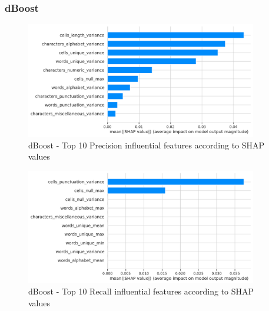 \subsubsection{dBoost}
\begin{figure}[H]
    \centering
    \includegraphics[width=0.9\textwidth]{thesis/Figures/RQ4/Shap_cell_prec_dBoost.pdf}
    \caption{dBoost - Top 10 Precision influential features according to SHAP values}
    \label{fig:feature_importance_prec_dBoost}
\end{figure}
\begin{figure}[H]
    \centering
    \includegraphics[width=0.9\textwidth]{thesis/Figures/RQ4/Shap_cell_rec_dBoost.pdf}
    \caption{dBoost - Top 10 Recall influential features according to SHAP values}
    \label{fig:feature_importance_rec_dBoost}
\end{figure}

